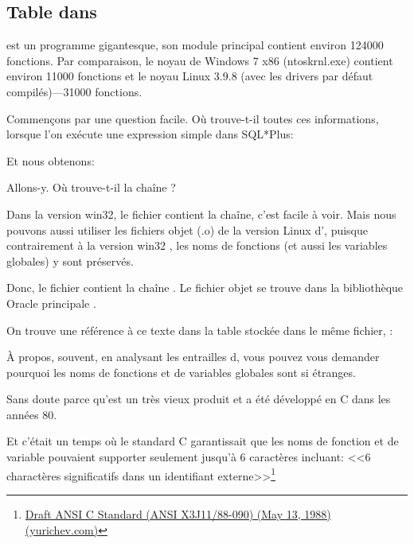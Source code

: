 \subsection{Table  dans \oracle}

\myindex{\oracle}
 est un programme gigantesque, son module principal  contient
environ 124000 fonctions. Par comparaison, le noyau de Windows 7 x86 (ntoskrnl.exe)
contient environ 11000 fonctions et le noyau Linux 3.9.8 (avec les drivers par défaut
compilés)---31000 fonctions.

Commençons par une question facile. Où \oracle trouve-t-il toutes ces informations,
lorsque l'on exécute une expression simple dans SQL*Plus:



Et nous obtenons:



Allons-y. Où \oracle trouve-t-il la chaîne ?

Dans la version win32, le fichier  contient la chaîne, c'est facile
à voir.
Mais nous pouvons aussi utiliser les fichiers objet (.o) de la version Linux d'\oracle,
puisque contrairement à la version win32 , les noms de fonctions (et
aussi les variables globales) y sont préservés.

Donc, le fichier  contient la chaîne .
Le fichier objet se trouve dans la bibliothèque Oracle principale .

On trouve une référence à ce texte dans la table  stockée dans le même
fichier, :



À propos, souvent, en analysant les entrailles d\oracle, vous pouvez vous demander
pourquoi les noms de fonctions et de variables globales sont si étranges.

Sans doute parce qu'\oracle est un très vieux produit et a été développé en C dans
les années 80.

Et c'était un temps où le standard C garantissait que les noms de fonction et de variable
pouvaient supporter seulement jusqu'à 6 caractères incluant: <<6 charactères significatifs
dans un identifiant externe>>\footnote{\href{http://go.yurichev.com/17142}{Draft
ANSI C Standard (ANSI X3J11/88-090) (May 13, 1988) (yurichev.com)}}

